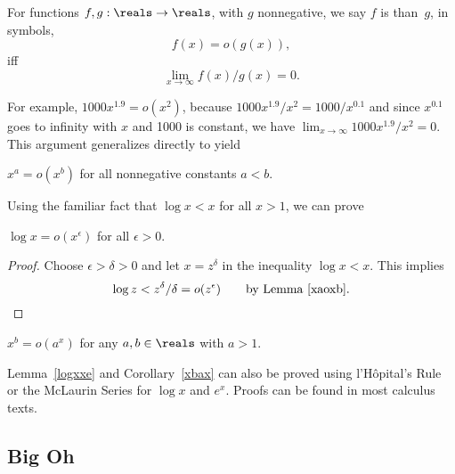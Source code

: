 \begin{definition}
  For functions $f,g: \reals \to \reals$, with $g$ nonnegative, we say
  $f$ is  than~$g$, in symbols,
\[
f(x) = o(g(x)),
\]
iff
\[
\lim_{x \rightarrow \infty} f(x)/g(x) = 0.
\]
\end{definition}

For example, $1000x^{1.9} = o(x^2)$, because $1000x^{1.9}/x^2 =
1000/x^{0.1}$ and since $x^{0.1}$ goes to infinity with $x$ and 1000 is
constant, we have $\lim_{x \rightarrow \infty} 1000x^{1.9}/x^2 = 0$.
This argument generalizes directly to yield
\begin{lemma}\label{xaoxb}
$x^a = o(x^b)$ for all nonnegative constants $a<b$.
\end{lemma}

Using the familiar fact that  $\log x < x$ for all $x >1$, we can prove
\begin{lemma}\label{logxxe}
$\log x = o(x^{\epsilon})$ for all $\epsilon >0$.
\end{lemma}

\begin{proof}
Choose $\epsilon > \delta > 0$ and let $x = z^\delta$ in the inequality
$\log x < x$.  This implies
\begin{equation}\label{zdd}
\log z  <  z^{\delta}/\delta
 =  o(z^{\epsilon})\qquad \text{by Lemma~\ref{xaoxb}}.
\end{equation}
\end{proof}

\begin{corollary}\label{xbax}
$x^b = o(a^x)$ for any $a,b \in \reals$ with $a>1$.
\end{corollary}

Lemma~\ref{logxxe} and Corollary~\ref{xbax} can also be proved using
l'H\^opital's Rule or the McLaurin Series for $\log x$ and $e^x$.
Proofs can be found in most calculus texts.

\subsection{Big Oh}

